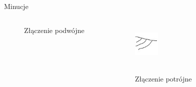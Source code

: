 \documentclass{beamer}
\begin{document}
\begin{frame}{Minucje}
\begin{columns}
\begin{figure}[t]
                \caption*{Złączenie podwójne}
            \end{figure}
            \begin{figure}[t]
			    \centering
                \includegraphics[width=0.4\textwidth]{fingerprints/minucje/zlaczenie3.jpg}\\~\
                \caption*{Złączenie potrójne}
            \end{figure}
    \end{columns}
\end{frame}
\end{document}
